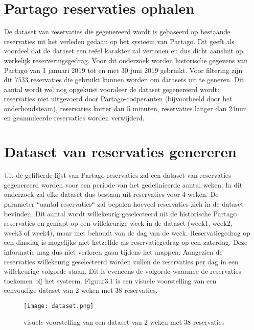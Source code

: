 \section{Partago reservaties ophalen}
De dataset van reservaties die gegenereerd wordt is gebaseerd op bestaande reservaties uit het verleden gedaan op het systeem van Partago. Dit geeft als voordeel dat de dataset een reëel karakter zal vertonen en dus dicht aansluit op werkelijk reserveringsgedrag. Voor dit onderzoek worden historische gegevens van Partago van 1 januari 2019 tot en met 30 juni 2019 gebruikt. Voor filtering zijn dit 7533 reservaties die gebruikt kunnen worden om datasets uit te generen. Dit aantal wordt wel nog opgekuist vooraleer de dataset gegenereerd wordt: reservaties niet uitgevoerd door Partago-coöperanten (bijvoorbeeld door het onderhoudsteam), reservaties korter dan 5 minuten, reservaties langer dan 24uur en geannuleerde reservaties worden verwijderd.

\section{Dataset van reservaties genereren}
Uit de gefilterde lijst van Partago reservaties zal een dataset van reservaties gegenereerd worden voor een periode van het gedefinieerde aantal weken. In dit onderzoek zal elke dataset dus bestaan uit reservaties voor 4 weken. De parameter ``aantal reservaties`` zal bepalen hoeveel reservaties zich in de dataset bevinden. Dit aantal wordt willekeurig geselecteerd uit de historische Partago reservaties en gemapt op een willekeurige week in de dataset (week1, week2, week3 of week4), maar met behoudt van de dag van de week. Reservatiegedrag op een dinsdag is mogelijks niet hetzelfde als reservatiegedrag op een zaterdag. Deze informatie mag dus niet verloren gaan tijdens het mappen. Aangezien de reservaties willekeurig geselecteerd worden zullen de reservaties per dag in een willekeurige volgorde staan. Dit is eveneens de volgorde waarmee de reservaties toekomen bij het systeem. Figuur3.1 is een visuele voorstelling van een eenvoudige dataset van 2 weken met 38 reservaties.
\begin{figure}[h]
	\texttt{[image: dataset.png]}
	\caption[visuele voorstelling dataset]{visuele voorstelling van een dataset van 2 weken met 38 reservaties}
\end{figure}
